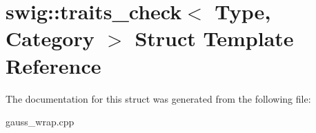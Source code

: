 \hypertarget{structswig_1_1traits__check}{\section{swig\-:\-:traits\-\_\-check$<$ Type, Category $>$ Struct Template Reference}
\label{structswig_1_1traits__check}
}


The documentation for this struct was generated from the following file\-:\begin{DoxyCompactItemize}
\item 
gauss\-\_\-wrap.\-cpp\end{DoxyCompactItemize}
